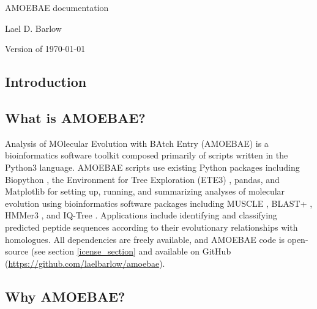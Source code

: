 \documentclass[12pt,letterpaper]{article}
\begin{document}
\begin{titlepage}
	\centering
    {\huge AMOEBAE documentation\par}
	\vspace{2cm}
    {\Large Lael D. Barlow\par}
	\vfill
	{\large Version of \today\par}
\end{titlepage}

\newpage
\tableofcontents

\newpage
{}
\begin{linenumbers}

\section{Introduction}


\subsection{What is AMOEBAE?}

Analysis of MOlecular Evolution with BAtch Entry (AMOEBAE) is a bioinformatics
    software toolkit composed primarily of scripts written in the Python3
    language.  AMOEBAE scripts use existing Python packages including Biopython
    \citep{cock2009}, the Environment for Tree Exploration (ETE3)
    \citep{huerta-cepas2016}, pandas, and Matplotlib \citep{hunter2007} for
    setting up, running, and summarizing analyses of molecular evolution using
    bioinformatics software packages including MUSCLE \citep{edgar2004}, BLAST+
    \citep{camacho2009}, HMMer3 \citep{eddy1998}, and IQ-Tree
    \citep{nguyen2015}. Applications include identifying and classifying
    predicted peptide sequences according to their evolutionary relationships
    with homologues. All dependencies are freely available, and AMOEBAE code is
    open-source (see section \ref{icense_section} and available on GitHub
    (\url{https://github.com/laelbarlow/amoebae}). 

\subsection{Why AMOEBAE?}


\end{linenumbers}
\end{document}
